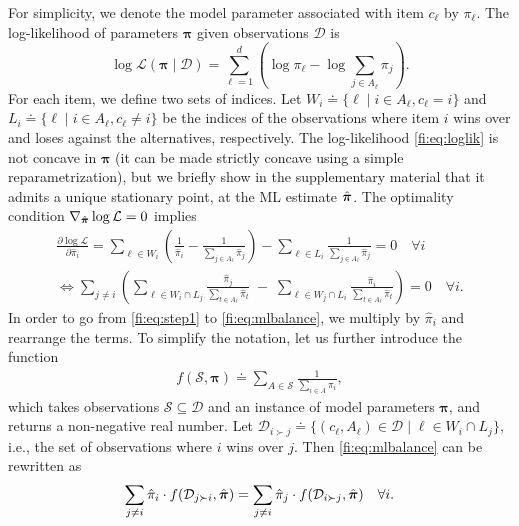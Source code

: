For simplicity, we denote the model parameter associated with item $c_\ell$ by $\pi_\ell$.
The log-likelihood of parameters $\bm{\pi}$ given observations $\mathcal{D}$ is
\begin{equation}
\label{fi:eq:loglik}
\log \mathcal{L}(\bm{\pi} \mid \mathcal{D}) = \sum_{\ell = 1}^d \left( \log \pi_\ell - \log{\sum_{j \in A_\ell} \pi_j} \right).
\end{equation}
For each item, we define two sets of indices.
Let $W_i \doteq \{ \ell \mid i \in A_\ell, c_\ell = i \}$ and $L_i \doteq \{ \ell \mid i \in A_\ell, c_\ell \ne i \}$ be the indices of the observations where item $i$ wins over and loses against the alternatives, respectively.
The log-likelihood \eqref{fi:eq:loglik} is not concave in $\bm{\pi}$ (it can be made strictly concave using a simple reparametrization), but we briefly show in the supplementary material that it admits a unique stationary point, at the ML estimate $\hat{\bm{\pi}}$.
The optimality condition $\nabla_{\hat{\bm{\pi}}} \log \mathcal{L} = 0$ implies
\begin{align}
 \frac{\partial \log \mathcal{L}}{\partial \hat{\pi}_i}
     = \sum_{\ell \in W_i} \left( \frac{1}{\hat{\pi}_i} - \frac{1}{\sum_{j \in A_\ell} \hat{\pi}_j} \right)
       - \sum_{\ell \in L_i} \frac{1}{\sum_{j \in A_\ell} \hat{\pi}_j} = 0 \quad \forall i \label{fi:eq:step1} \\
 \iff  \sum_{j \ne i} \left(
      \sum_{\ell \in W_i \cap L_j} \frac{\hat{\pi}_j}{\sum_{t \in A_\ell} \hat{\pi}_t}
      \;-\; \sum_{\ell \in W_j \cap L_i} \frac{\hat{\pi}_i}{\sum_{t \in A_\ell} \hat{\pi}_t}
      \right) = 0 \quad \forall i. \label{fi:eq:mlbalance}
\end{align}
In order to go from \eqref{fi:eq:step1} to \eqref{fi:eq:mlbalance}, we multiply by $\hat{\pi}_i$ and rearrange the terms.
To simplify the notation, let us further introduce the function
\begin{align*}
f(\mathcal{S}, \bm{\pi}) \doteq \sum_{A \in \mathcal{S}} \frac{1}{\sum_{i \in A} \pi_i},
\end{align*}
which takes observations $\mathcal{S} \subseteq \mathcal{D}$ and an instance of model parameters $\bm{\pi}$, and returns a non-negative real number.
Let $\mathcal{D}_{i \succ j} \doteq \{ (c_\ell, A_\ell) \in \mathcal{D} \mid \ell \in W_i \cap L_j \}$, i.e., the set of observations where $i$ wins over $j$.
Then \eqref{fi:eq:mlbalance} can be rewritten as
\begin{align}
\label{fi:eq:master}
\sum_{j \ne i} \hat{\pi}_i \cdot f(\mathcal{D}_{j \succ i}, \hat{\bm{\pi}})
= \sum_{j \ne i} \hat{\pi}_j \cdot f(\mathcal{D}_{i \succ j}, \hat{\bm{\pi}}) \quad \forall i.
\end{align}
